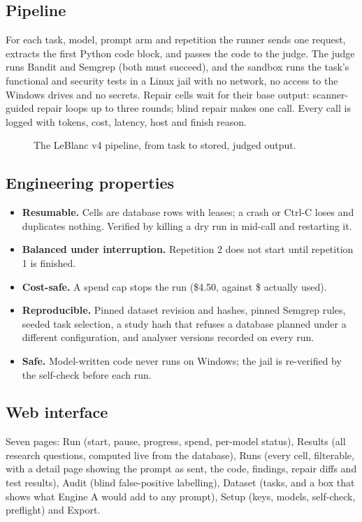 \documentclass[11pt]{article}
\begin{document}
\subsection{Pipeline}
For each task, model, prompt arm and repetition the runner sends one request, extracts the first Python code
block, and passes the code to the judge. The judge runs Bandit and Semgrep (both must succeed), and the sandbox runs
the task's functional and security tests in a Linux jail with no network, no access to the Windows drives and no
secrets. Repair cells wait for their base output: scanner-guided repair loops up to three rounds; blind repair makes
one call. Every call is logged with tokens, cost, latency, host and finish reason.

\begin{figure}[H]\centering
\resizebox{\textwidth}{!}{}
\caption{The LeBlanc v4 pipeline, from task to stored, judged output.}
\end{figure}

\subsection{Engineering properties}
\begin{itemize}
\item \textbf{Resumable.} Cells are database rows with leases; a crash or Ctrl-C loses and duplicates nothing.
      Verified by killing a dry run in mid-call and restarting it.
\item \textbf{Balanced under interruption.} Repetition 2 does not start until repetition 1 is finished.
\item \textbf{Cost-safe.} A spend cap stops the run (\$4.50, against \$\TotalCost{} actually used).
\item \textbf{Reproducible.} Pinned dataset revision and hashes, pinned Semgrep rules, seeded task selection, a
      study hash that refuses a database planned under a different configuration, and analyser versions recorded
      on every run.
\item \textbf{Safe.} Model-written code never runs on Windows; the jail is re-verified by the self-check before
      each run.
\end{itemize}

\subsection{Web interface}
Seven pages: Run (start, pause, progress, spend, per-model status), Results (all research questions, computed
live from the database), Runs (every cell, filterable, with a detail page showing the prompt as sent, the code,
findings, repair diffs and test results), Audit (blind false-positive labelling), Dataset (tasks, and a box that
shows what Engine A would add to any prompt), Setup (keys, models, self-check, preflight) and Export.
\end{document}
